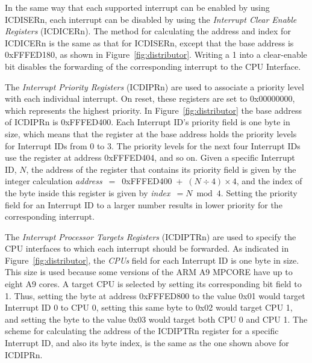 \documentclass[11pt, twoside, pdftex]{article}
\begin{document}
In the same way that each supported interrupt can be enabled by using ICDISERn, each 
interrupt can be disabled by using the {\it Interrupt Clear Enable Registers} (ICDICERn). 
The method for calculating the address and index for ICDICERn is the same as that for 
ICDISERn, except that the base address is {\sf 0xFFFED180}, as shown in 
Figure~\ref{fig:distributor}.  Writing a 1 into a clear-enable bit disables the forwarding 
of the corresponding interrupt to the CPU Interface.

The {\it Interrupt Priority Registers} (ICDIPRn) are used to associate a priority level
with each individual interrupt. On reset, these registers are set to {\sf 0x00000000},
which represents the highest priority.  In Figure~\ref{fig:distributor} 
the base address of ICDIPRn is {\sf 0xFFFED400}. Each
Interrupt ID's priority field is one byte in size, which means that the register at the 
base address holds the priority levels for Interrupt IDs from 0 to 3. The
priority levels for the next four Interrupt IDs use the register at address {\sf
0xFFFED404}, and so on.  Given a specific Interrupt ID, $N$, the address of the register 
that contains its priority field is given by the integer calculation 
{\it address}~$=$~{\sf 0xFFFED400}~+~$(N \div 4) \times 4$, and 
the index of the byte inside this register is given by {\it index}~$= N \bmod 4$.
Setting the priority field for an Interrupt ID to a larger number results in lower priority 
for the corresponding interrupt.

The {\it Interrupt Processor Targets Registers} (ICDIPTRn) are used to specify the CPU 
interfaces to which each interrupt should be forwarded. As indicated in 
Figure~\ref{fig:distributor}, the {\it CPUs} field for each Interrupt ID is one byte in
size. This size is used because some versions of the ARM A9 MPCORE have up to eight
A9 cores.  A target CPU is selected by setting its corresponding bit field to 1. Thus,
setting the byte at address {\sf 0xFFFED800} to the value {\sf 0x01} would target Interrupt ID 0
to CPU 0, setting this same byte to {\sf 0x02} would target CPU 1, and setting the byte to the 
value {\sf 0x03} would target both CPU 0 and CPU 1.  The scheme for calculating the address 
of the ICDIPTRn register for a specific Interrupt ID, and also its byte index, is the same 
as the one shown above for ICDIPRn. 
\end{document}
